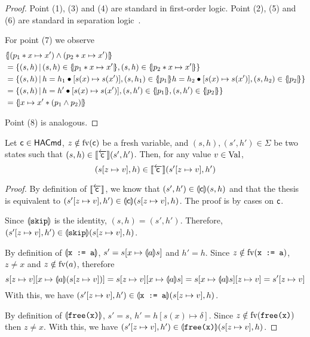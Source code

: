 \begin{proof}
	Point (1), (3) and (4) are standard in first-order logic. Point (2), (5) and (6) are standard in separation logic~\cite{Reynolds02}.

	For point (7) we observe
	\begin{align*}
		 & \asldenot{(p_1 \andsep x \mapsto x') \land (p_2 \andsep x \mapsto x')}                                                                                             \\
		 & =\{ (s, h) \svert (s, h) \in \asldenot{p_1 \andsep x \mapsto x'}, (s, h) \in \asldenot{p_2 \andsep x \mapsto x'} \}                                                \\
		 & =\lbrace (s, h) \svert h = h_1 \bullet [s(x) \mapsto s(x')], (s, h_1) \in \asldenot{p_1} h = h_2 \bullet [s(x) \mapsto s(x')], (s, h_2) \in \asldenot{p_2} \rbrace \\
		 & =\{ (s, h) \svert h = h' \bullet [s(x) \mapsto s(x')], (s, h') \in \asldenot{p_1}, (s, h') \in \asldenot{p_2}  \}                                                  \\
		 & =\asldenot{x \mapsto x' \andsep (p_1 \land p_2)}
	\end{align*}

	Point (8) is analogous.
\end{proof}

\begin{lemma}\label{lmm:app:semantics-fresh-substitution}
	Let $\mathsf{c} \in \mathsf{HACmd}$, $z \notin \text{fv}(\mathsf{c})$ be a fresh variable, and $(s, h), (s', h') \in \Sigma$ be two states such that $(s, h) \in \llbracket\overleftarrow{\mathsf{c}}\rrbracket (s', h')$. Then, for any value $v \in \text{Val}$,
	\[
	(s[z \mapsto v], h) \in \llbracket\overleftarrow{\mathsf{c}}\rrbracket (s'[z \mapsto v], h')
	\]
\end{lemma}
\begin{proof}
	By definition of $\llbracket\overleftarrow{\mathsf{c}}\rrbracket$, we know that $(s', h') \in \llparenthesis\mathsf{c}\rrparenthesis (s, h)$ and that the thesis is equivalent to $(s'[z \mapsto v], h') \in \llparenthesis\mathsf{c}\rrparenthesis (s[z \mapsto v], h)$.
	The proof is by cases on $\mathsf{c}$.

	Since $\llparenthesis\texttt{skip}\rrparenthesis$ is the identity, $(s, h) = (s', h')$. Therefore, $(s'[z \mapsto v], h') \in \llparenthesis\texttt{skip}\rrparenthesis (s[z \mapsto v], h)$.

	By definition of $\llparenthesis\texttt{x := a}\rrparenthesis$, $s' = s[x \mapsto \llparenthesis a\rrparenthesis s]$ and $h' = h$. Since $z \notin \text{fv}(\texttt{x := a})$, $z \neq x$ and $z \notin \text{fv}(a)$, therefore
	\[
	s[z \mapsto v][x \mapsto \llparenthesis a\rrparenthesis(s[z \mapsto v])] = s[z \mapsto v][x \mapsto \llparenthesis a\rrparenthesis s] = s[x \mapsto \llparenthesis a\rrparenthesis s][z \mapsto v] = s'[z \mapsto v]
	\]
	With this, we have $(s'[z \mapsto v], h') \in \llparenthesis\texttt{x := a}\rrparenthesis(s[z \mapsto v], h)$.

	By definition of $\llparenthesis\texttt{free(x)}\rrparenthesis$, $s' = s$, $h' = h[s(x) \mapsto \delta]$. Since $z \notin \text{fv}(\texttt{free(x)})$ then $z \neq x$. With this, we have $(s'[z \mapsto v], h') \in \llparenthesis\texttt{free(x)}\rrparenthesis (s[z \mapsto v], h)$.
\end{proof}

